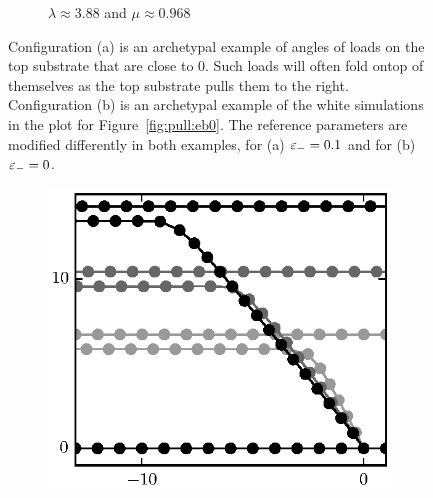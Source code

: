 \begin{figure}[t]
\begin{subfigure}{.5\textwidth}
         \caption{$\lambda\approx3.88$ and $\mu\approx0.968$\label{subfig:barely_adhered}}
      \end{subfigure}
      \caption{Configuration (a) is an archetypal example of angles of loads on the top substrate that are close to 0. Such loads will often fold ontop of themselves as the top substrate pulls them to the right. Configuration (b) is an archetypal example of the white simulations in the plot for Figure~\ref{fig:pull:eb0}. The reference parameters are modified differently in both examples, for (a) $\varepsilon_-=0.1$ and for (b) $\varepsilon_-=0$.\label{fig:pull_equil}} 
   \end{figure}

   \begin{figure}[t]
      \centering
      \begin{subfigure}{.5\textwidth}
         \centering
         \includegraphics{./fig/ch3/pull/unzip_anim.eps}
         \caption{\label{subfig:unzip}}
      \end{subfigure}%
      ~
      \begin{subfigure}{.5\textwidth}
         \centering

\end{subfigure}
\end{figure}
